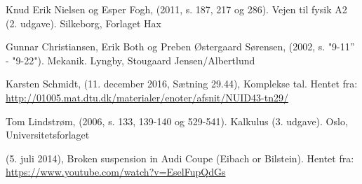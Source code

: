 \begin{thebibliography}{9}


 
  Knud Erik Nielsen og Esper Fogh,
  (2011, s. 187, 217 og 286). 
  Vejen til fysik A2 (2. udgave). 
  Silkeborg,
  Forlaget Hax

  Gunnar Christiansen, Erik Both og Preben Østergaard Sørensen,
  (2002, s. "9-11'' - "9-22"). 
  Mekanik. 
  Lyngby,
  Stougaard Jensen/Albertlund
  
Karsten Schmidt,
(11. december 2016, Sætning 29.44), Komplekse tal. Hentet fra:
\url{http://01005.mat.dtu.dk/materialer/enoter/afsnit/NUID43-tn29/}

  Tom Lindstrøm,
  (2006, s. 133, 139-140 og 529-541). 
  Kalkulus (3. udgave). 
  Oslo,
  Universitetsforlaget
 
 (5. juli 2014), Broken suspension in Audi Coupe (Eibach or Bilstein). Hentet fra:
 \url{https://www.youtube.com/watch?v=EselFupQdGs}
  
\end{thebibliography}